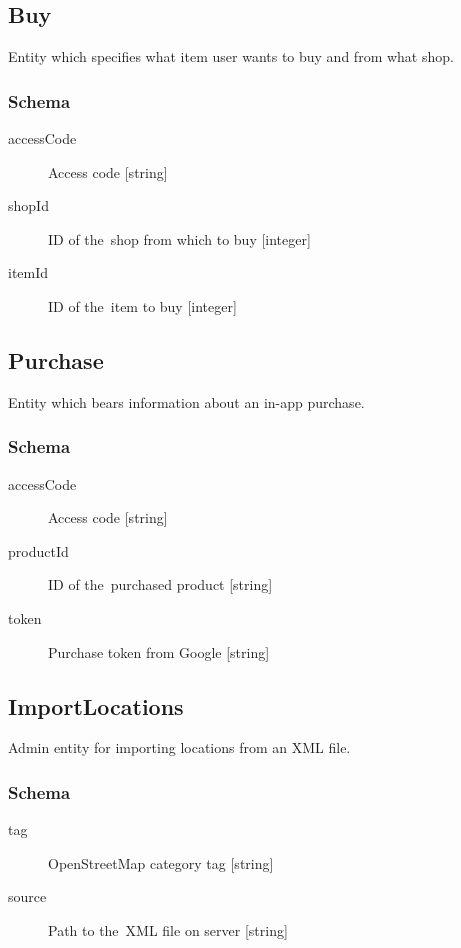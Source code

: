 	\subsection{Buy}
		\label{json:buy}
		Entity which specifies what item user wants to buy and from what shop.

		\subsubsection{Schema}
			\begin{description}
				\item[accessCode] Access code [string]
				\item[shopId] ID of the~shop from which to buy [integer]
				\item[itemId] ID of the~item to buy [integer]
			\end{description}
	
	\subsection{Purchase}
		\label{json:purchase}
		Entity which bears information about an in-app purchase.
		\subsubsection{Schema}
			\begin{description}
				\item[accessCode] Access code [string]
				\item[productId] ID of the~purchased product [string]
				\item[token] Purchase token from Google [string]
			\end{description}
		
	\subsection{ImportLocations}
		\label{json:importlocations}
		Admin entity for importing locations from an XML file.
		\subsubsection{Schema}
			\begin{description}
				\item[tag] OpenStreetMap category tag [string]
				\item[source] Path to the~XML file on server [string]
			\end{description}
		
